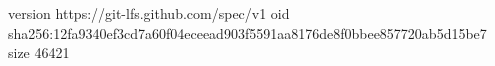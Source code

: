 version https://git-lfs.github.com/spec/v1
oid sha256:12fa9340ef3cd7a60f04eceead903f5591aa8176de8f0bbee857720ab5d15be7
size 46421
